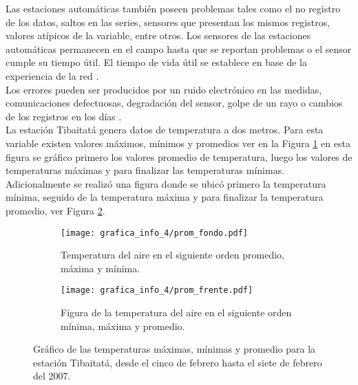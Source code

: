 Las estaciones automáticas también poseen problemas tales como el no registro de los datos, saltos en las series, sensores que presentan los mismos registros, valores atípicos de la variable, entre otros.  Los sensores de las estaciones automáticas permanecen en el campo hasta que se reportan problemas o el sensor cumple su tiempo útil. El tiempo de vida útil se establece en base de la experiencia de la red \citep{Shafer2000}.\\

Los errores pueden ser producidos por un ruido electrónico en las medidas, comunicaciones defectuosas, degradación del sensor, golpe de un rayo o cambios de los registros en los días \citep{Menne2001}.\\

La estación Tibaitatá genera datos de temperatura a dos metros. Para esta variable existen valores máximos, mínimos y promedios ver en la Figura \ref{subfig:b9} en esta figura se gráfico primero los valores promedio de temperatura, luego los valores de temperaturas máximas y para finalizar las temperaturas mínimas. Adicionalmente se realizó una figura donde se ubicó primero la temperatura mínima, seguido de la temperatura máxima y para finalizar la temperatura promedio, ver Figura \ref{subfig:b10}.


\begin{figure}[H]
	\centering
			\begin{subfigure}[b]{0.4\textwidth}

			\caption{Temperatura del aire en el siguiente orden promedio, máxima y mínima.}
			\texttt{[image: grafica\_info\_4/prom\_fondo.pdf]}
			\label{subfig:b9}

			\end{subfigure}
			\begin{subfigure}[b]{0.4\textwidth}

			\caption{Figura de la temperatura del aire en el siguiente orden mínima, máxima y promedio.}
			\texttt{[image: grafica\_info\_4/prom\_frente.pdf]}
			\label{subfig:b10}

			\end{subfigure}			

		
		\caption{Gráfico de las temperaturas máximas, mínimas y promedio para la estación Tibaitatá, desde el cinco de febrero hasta el siete de febrero del 2007.}
		\label{gra:conv_vali}
	
\end{figure}

